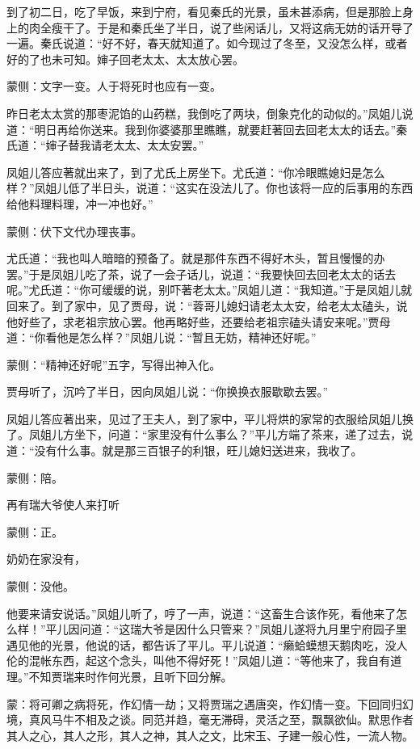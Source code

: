 \begin{parag}
    到了初二日，吃了早饭，来到宁府，看见秦氏的光景，虽未甚添病，但是那脸上身上的肉全瘦干了。于是和秦氏坐了半日，说了些闲话儿，又将这病无妨的话开导了一遍。秦氏说道：“好不好，春天就知道了。如今现过了冬至，又没怎么样，或者好的了也未可知。婶子回老太太、太太放心罢。\begin{note}蒙侧：文字一变。人于将死时也应有一变。\end{note}昨日老太太赏的那枣泥馅的山药糕，我倒吃了两块，倒象克化的动似的。”凤姐儿说道：“明日再给你送来。我到你婆婆那里瞧瞧，就要赶著回去回老太太的话去。”秦氏道：“婶子替我请老太太、太太安罢。”
\end{parag}


\begin{parag}
    凤姐儿答应著就出来了，到了尤氏上房坐下。尤氏道：“你冷眼瞧媳妇是怎么样？”凤姐儿低了半日头，说道：“这实在没法儿了。你也该将一应的后事用的东西给他料理料理，冲一冲也好。”\begin{note}蒙侧：伏下文代办理丧事。\end{note}尤氏道：“我也叫人暗暗的预备了。就是那件东西不得好木头，暂且慢慢的办罢。”于是凤姐儿吃了茶，说了一会子话儿，说道：“我要快回去回老太太的话去呢。”尤氏道：“你可缓缓的说，别吓著老太太。”凤姐儿道：“我知道。”于是凤姐儿就回来了。到了家中，见了贾母，说：“蓉哥儿媳妇请老太太安，给老太太磕头，说他好些了，求老祖宗放心罢。他再略好些，还要给老祖宗磕头请安来呢。”贾母道：“你看他是怎么样？”凤姐儿说：“暂且无妨，精神还好呢。”\begin{note}蒙侧：“精神还好呢”五字，写得出神入化。\end{note}贾母听了，沉吟了半日，因向凤姐儿说：“你换换衣服歇歇去罢。”
\end{parag}


\begin{parag}
    凤姐儿答应著出来，见过了王夫人，到了家中，平儿将烘的家常的衣服给凤姐儿换了。凤姐儿方坐下，问道：“家里没有什么事么？”平儿方端了茶来，递了过去，说道：“没有什么事。就是那三百银子的利银，旺儿媳妇送进来，我收了。\begin{note}蒙侧：陪。\end{note}再有瑞大爷使人来打听\begin{note}蒙侧：正。\end{note}奶奶在家没有，\begin{note}蒙侧：没他。\end{note}他要来请安说话。”凤姐儿听了，哼了一声，说道：“这畜生合该作死，看他来了怎么样！”平儿因问道：“这瑞大爷是因什么只管来？”凤姐儿遂将九月里宁府园子里遇见他的光景，他说的话，都告诉了平儿。平儿说道：“癞蛤蟆想天鹅肉吃，没人伦的混帐东西，起这个念头，叫他不得好死！”凤姐儿道：“等他来了，我自有道理。”不知贾瑞来时作何光景，且听下回分解。
\end{parag}


\begin{parag}
    \begin{note}蒙：将可卿之病将死，作幻情一劫；又将贾瑞之遇唐突，作幻情一变。下回同归幻境，真风马牛不相及之谈。同范并趋，毫无滞碍，灵活之至，飘飘欲仙。默思作者其人之心，其人之形，其人之神，其人之文，比宋玉、子建一般心性，一流人物。\end{note}
\end{parag}
